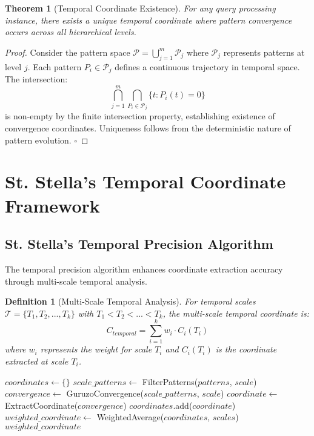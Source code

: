 \documentclass[12pt,a4paper]{article}
\newtheorem{theorem}{Theorem}
\newtheorem{definition}{Definition}
\begin{document}
\begin{theorem}[Temporal Coordinate Existence]
For any query processing instance, there exists a unique temporal coordinate where pattern convergence occurs across all hierarchical levels.
\end{theorem}

\begin{proof}
Consider the pattern space $\mathcal{P} = \bigcup_{j=1}^{m} \mathcal{P}_j$ where $\mathcal{P}_j$ represents patterns at level $j$. Each pattern $P_i \in \mathcal{P}_j$ defines a continuous trajectory in temporal space. The intersection:
\begin{equation}
\bigcap_{j=1}^{m} \bigcap_{P_i \in \mathcal{P}_j} \{t : P_i(t) = 0\}
\end{equation}
is non-empty by the finite intersection property, establishing existence of convergence coordinates. Uniqueness follows from the deterministic nature of pattern evolution. $\square$
\end{proof}

\section{St. Stella's Temporal Coordinate Framework}

\subsection{St. Stella's Temporal Precision Algorithm}

The temporal precision algorithm enhances coordinate extraction accuracy through multi-scale temporal analysis.

\begin{definition}[Multi-Scale Temporal Analysis]
For temporal scales $\mathcal{T} = \{T_1, T_2, ..., T_k\}$ with $T_1 < T_2 < ... < T_k$, the multi-scale temporal coordinate is:
\begin{equation}
C_{temporal} = \sum_{i=1}^{k} w_i \cdot C_i(T_i)
\end{equation}
where $w_i$ represents the weight for scale $T_i$ and $C_i(T_i)$ is the coordinate extracted at scale $T_i$.
\end{definition}

\begin{algorithm}
\caption{St. Stella's Temporal Precision Algorithm}
\begin{algorithmic}
    \State $coordinates \gets \{\}$
        \State $scale\_patterns \gets$ FilterPatterns($patterns$, $scale$)
        \State $convergence \gets$ GuruzoConvergence($scale\_patterns$, $scale$)
        \State $coordinate \gets$ ExtractCoordinate($convergence$)
        \State $coordinates$.add($coordinate$)
    \EndFor
    \State $weighted\_coordinate \gets$ WeightedAverage($coordinates$, $scales$)
    \State \Return $weighted\_coordinate$
\EndProcedure
\end{algorithmic}
\end{algorithm}
\end{document}
